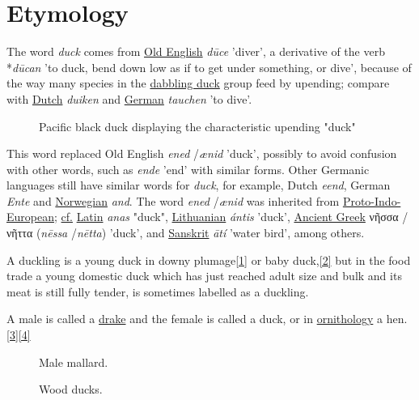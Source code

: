 \documentclass[11pt,a4paper]{article}
\begin{document}
\section{Etymology}

The word \textit{duck} comes from \href{/wiki/Old\_English}{Old English} \textit{dūce} 'diver', a derivative of the verb *\textit{dūcan} 'to duck, bend down low as if to get under something, or dive', because of the way many species in the \href{/wiki/Dabbling\_duck}{dabbling duck} group feed by upending; compare with \href{/wiki/Dutch\_language}{Dutch} \textit{duiken} and \href{/wiki/German\_language}{German} \textit{tauchen} 'to dive'.

\begin{figure}[h]
\caption{Pacific black duck displaying the characteristic upending "duck"}
\end{figure}

This word replaced Old English \textit{ened} /\textit{ænid} 'duck', possibly to avoid confusion with other words, such as \textit{ende} 'end' with similar forms. Other Germanic languages still have similar words for \textit{duck}, for example, Dutch \textit{eend}, German \textit{Ente} and \href{/wiki/Norwegian\_language}{Norwegian} \textit{and}. The word \textit{ened} /\textit{ænid} was inherited from \href{/wiki/Proto-Indo-European\_language}{Proto-Indo-European}; \href{/wiki/Cf.}{cf.} \href{/wiki/Latin}{Latin} \textit{anas} "duck", \href{/wiki/Lithuanian\_language}{Lithuanian} \textit{ántis} 'duck', \href{/wiki/Ancient\_Greek\_language}{Ancient Greek} νῆσσα /νῆττα (\textit{nēssa} /\textit{nētta}) 'duck', and \href{/wiki/Sanskrit}{Sanskrit} \textit{ātí} 'water bird', among others.

A duckling is a young duck in downy plumage\href{\#cite\_note-1}{[1]} or baby duck,\href{\#cite\_note-2}{[2]} but in the food trade a young domestic duck which has just reached adult size and bulk and its meat is still fully tender, is sometimes labelled as a duckling.

A male is called a \href{https://en.wiktionary.org/wiki/drake}{drake} and the female is called a duck, or in \href{/wiki/Ornithology}{ornithology} a hen.\href{\#cite\_note-3}{[3]}\href{\#cite\_note-4}{[4]}

\begin{figure}[h]
\caption{Male mallard.}
\end{figure}

\begin{figure}[h]
\caption{Wood ducks.}
\end{figure}
\end{document}
